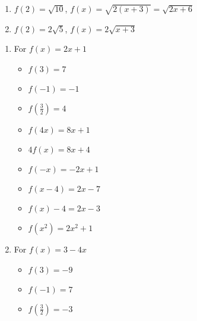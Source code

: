\begin{multicols}{2}
\begin{enumerate}
\setcounter{enumi}{\value{HW}}

\item $f(2) = \sqrt{10}$, $f(x) = \sqrt{2(x+3)} = \sqrt{2x+6}$

\item $f(2) = 2 \sqrt{5}$, $f(x) = 2\sqrt{x+3}$ 

\setcounter{HW}{\value{enumi}}
\end{enumerate}
\end{multicols}

\begin{enumerate}
\setcounter{enumi}{\value{HW}}

\item For $f(x) = 2x+1$ 

\begin{multicols}{3}
\begin{itemize}
\item $f(3) = 7$
\item $f(-1) = -1$
\item $f\left(\frac{3}{2} \right) = 4$
\end{itemize}
\end{multicols}

\begin{multicols}{3}
\begin{itemize}
\item  $f(4x) = 8x+1$
\item $4f(x) = 8x+4$
\item $f(-x) = -2x+1$
\end{itemize}
\end{multicols}

\begin{multicols}{3}
\begin{itemize}
\item  $f(x-4) = 2x-7$
\item $f(x) - 4 = 2x-3$
\item  $f\left(x^2\right) = 2x^2+1$
\end{itemize}
\end{multicols}

\item For $f(x) = 3-4x$ 

\begin{multicols}{3}
\begin{itemize}
\item $f(3) = -9$
\item $f(-1) = 7$
\item $f\left(\frac{3}{2} \right) = -3$
\end{itemize}
\end{multicols}


\end{enumerate}
